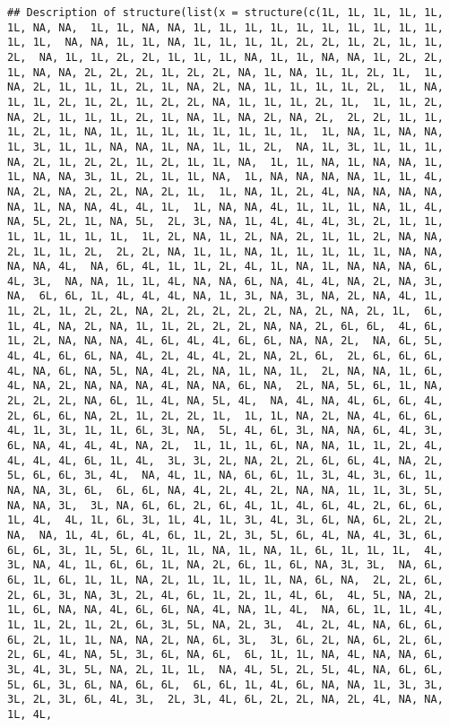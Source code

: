 \documentclass[
]{article}
\begin{document}
\begin{verbatim}
## Description of structure(list(x = structure(c(1L, 1L, 1L, 1L, 1L, 1L, NA, NA,  1L, 1L, NA, NA, 1L, 1L, 1L, 1L, 1L, 1L, 1L, 1L, 1L, 1L, 1L, 1L,  NA, NA, 1L, 1L, NA, 1L, 1L, 1L, 1L, 2L, 2L, 1L, 2L, 1L, 1L, 2L,  NA, 1L, 1L, 2L, 2L, 1L, 1L, 1L, NA, 1L, 1L, NA, NA, 1L, 2L, 2L,  1L, NA, NA, 2L, 2L, 2L, 1L, 2L, 2L, NA, 1L, NA, 1L, 1L, 2L, 1L,  1L, NA, 2L, 1L, 1L, 1L, 2L, 1L, NA, 2L, NA, 1L, 1L, 1L, 1L, 2L,  1L, NA, 1L, 1L, 2L, 1L, 2L, 1L, 2L, 2L, NA, 1L, 1L, 1L, 2L, 1L,  1L, 1L, 2L, NA, 2L, 1L, 1L, 1L, 2L, 1L, NA, 1L, NA, 2L, NA, 2L,  2L, 2L, 1L, 1L, 1L, 2L, 1L, NA, 1L, 1L, 1L, 1L, 1L, 1L, 1L, 1L,  1L, NA, 1L, NA, NA, 1L, 3L, 1L, 1L, NA, NA, 1L, NA, 1L, 1L, 2L,  NA, 1L, 3L, 1L, 1L, 1L, NA, 2L, 1L, 2L, 2L, 1L, 2L, 1L, 1L, NA,  1L, 1L, NA, 1L, NA, NA, 1L, 1L, NA, NA, 3L, 1L, 2L, 1L, 1L, NA,  1L, NA, NA, NA, NA, 1L, 1L, 4L, NA, 2L, NA, 2L, 2L, NA, 2L, 1L,  1L, NA, 1L, 2L, 4L, NA, NA, NA, NA, NA, 1L, NA, NA, 4L, 4L, 1L,  1L, NA, NA, 4L, 1L, 1L, 1L, NA, 1L, 4L, NA, 5L, 2L, 1L, NA, 5L,  2L, 3L, NA, 1L, 4L, 4L, 4L, 3L, 2L, 1L, 1L, 1L, 1L, 1L, 1L, 1L,  1L, 2L, NA, 1L, 2L, NA, 2L, 1L, 1L, 2L, NA, NA, 2L, 1L, 1L, 2L,  2L, 2L, NA, 1L, 1L, NA, 1L, 1L, 1L, 1L, 1L, NA, NA, NA, NA, 4L,  NA, 6L, 4L, 1L, 1L, 2L, 4L, 1L, NA, 1L, NA, NA, NA, 6L, 4L, 3L,  NA, NA, 1L, 1L, 4L, NA, NA, 6L, NA, 4L, 4L, NA, 2L, NA, 3L, NA,  6L, 6L, 1L, 4L, 4L, 4L, NA, 1L, 3L, NA, 3L, NA, 2L, NA, 4L, 1L,  1L, 2L, 1L, 2L, 2L, NA, 2L, 2L, 2L, 2L, 2L, NA, 2L, NA, 2L, 1L,  6L, 1L, 4L, NA, 2L, NA, 1L, 1L, 2L, 2L, 2L, NA, NA, 2L, 6L, 6L,  4L, 6L, 1L, 2L, NA, NA, NA, 4L, 6L, 4L, 4L, 6L, 6L, NA, NA, 2L,  NA, 6L, 5L, 4L, 4L, 6L, 6L, NA, 4L, 2L, 4L, 4L, 2L, NA, 2L, 6L,  2L, 6L, 6L, 6L, 4L, NA, 6L, NA, 5L, NA, 4L, 2L, NA, 1L, NA, 1L,  2L, NA, NA, 1L, 6L, 4L, NA, 2L, NA, NA, NA, 4L, NA, NA, 6L, NA,  2L, NA, 5L, 6L, 1L, NA, 2L, 2L, 2L, NA, 6L, 1L, 4L, NA, 5L, 4L,  NA, 4L, NA, 4L, 6L, 6L, 4L, 2L, 6L, 6L, NA, 2L, 1L, 2L, 2L, 1L,  1L, 1L, NA, 2L, NA, 4L, 6L, 6L, 4L, 1L, 3L, 1L, 1L, 6L, 3L, NA,  5L, 4L, 6L, 3L, NA, NA, 6L, 4L, 3L, 6L, NA, 4L, 4L, 4L, NA, 2L,  1L, 1L, 1L, 6L, NA, NA, 1L, 1L, 2L, 4L, 4L, 4L, 4L, 6L, 1L, 4L,  3L, 3L, 2L, NA, 2L, 2L, 6L, 6L, 4L, NA, 2L, 5L, 6L, 6L, 3L, 4L,  NA, 4L, 1L, NA, 6L, 6L, 1L, 3L, 4L, 3L, 6L, 1L, NA, NA, 3L, 6L,  6L, 6L, NA, 4L, 2L, 4L, 2L, NA, NA, 1L, 1L, 3L, 5L, NA, NA, 3L,  3L, NA, 6L, 6L, 2L, 6L, 4L, 1L, 4L, 6L, 4L, 2L, 6L, 6L, 1L, 4L,  4L, 1L, 6L, 3L, 1L, 4L, 1L, 3L, 4L, 3L, 6L, NA, 6L, 2L, 2L, NA,  NA, 1L, 4L, 6L, 4L, 6L, 1L, 2L, 3L, 5L, 6L, 4L, NA, 4L, 3L, 6L,  6L, 6L, 3L, 1L, 5L, 6L, 1L, 1L, NA, 1L, NA, 1L, 6L, 1L, 1L, 1L,  4L, 3L, NA, 4L, 1L, 6L, 6L, 1L, NA, 2L, 6L, 1L, 6L, NA, 3L, 3L,  NA, 6L, 6L, 1L, 6L, 1L, 1L, NA, 2L, 1L, 1L, 1L, 1L, NA, 6L, NA,  2L, 2L, 6L, 2L, 6L, 3L, NA, 3L, 2L, 4L, 6L, 1L, 2L, 1L, 4L, 6L,  4L, 5L, NA, 2L, 1L, 6L, NA, NA, 4L, 6L, 6L, NA, 4L, NA, 1L, 4L,  NA, 6L, 1L, 1L, 4L, 1L, 1L, 2L, 1L, 2L, 6L, 3L, 5L, NA, 2L, 3L,  4L, 2L, 4L, NA, 6L, 6L, 6L, 2L, 1L, 1L, NA, NA, 2L, NA, 6L, 3L,  3L, 6L, 2L, NA, 6L, 2L, 6L, 2L, 6L, 4L, NA, 5L, 3L, 6L, NA, 6L,  6L, 1L, 1L, NA, 4L, NA, NA, 6L, 3L, 4L, 3L, 5L, NA, 2L, 1L, 1L,  NA, 4L, 5L, 2L, 5L, 4L, NA, 6L, 6L, 5L, 6L, 3L, 6L, NA, 6L, 6L,  6L, 6L, 1L, 4L, 6L, NA, NA, 1L, 3L, 3L, 3L, 2L, 3L, 6L, 4L, 3L,  2L, 3L, 4L, 6L, 2L, 2L, NA, 2L, 4L, NA, NA, 1L, 4L, 
\end{verbatim}
\end{document}
